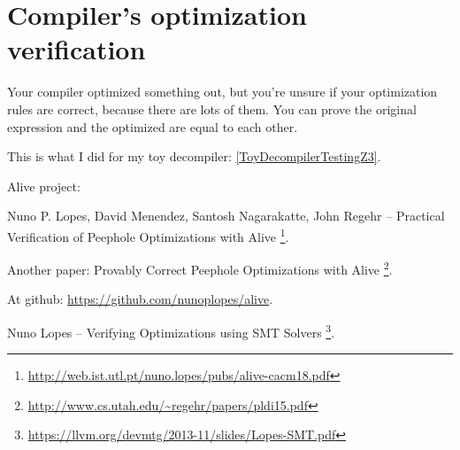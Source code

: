 \section{Compiler's optimization verification}

Your compiler optimized something out, but you're unsure if your optimization rules are correct, because there are lots of them.
You can prove the original expression and the optimized are equal to each other.

This is what I did for my toy decompiler: \ref{ToyDecompilerTestingZ3}.

Alive project:

Nuno P. Lopes, David Menendez, Santosh Nagarakatte, John Regehr -- Practical Verification of Peephole Optimizations with Alive
\footnote{\url{http://web.ist.utl.pt/nuno.lopes/pubs/alive-cacm18.pdf}}.

Another paper: Provably Correct Peephole Optimizations with Alive
\footnote{\url{http://www.cs.utah.edu/~regehr/papers/pldi15.pdf}}.

At github: \url{https://github.com/nunoplopes/alive}.

Nuno Lopes -- Verifying Optimizations using SMT Solvers
\footnote{\url{https://llvm.org/devmtg/2013-11/slides/Lopes-SMT.pdf}}.

